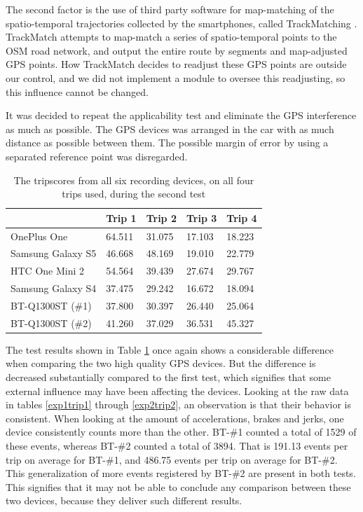 The second factor is the use of third party software for map-matching of the spatio-temporal trajectories collected by the smartphones, called TrackMatching \citep{trackmatch}. TrackMatch attempts to map-match a series of spatio-temporal points to the OSM road network, and output the entire route by segments and map-adjusted GPS points. How TrackMatch decides to readjust these GPS points are outside our control, and we did not implement a module to oversee this readjusting, so this influence cannot be changed. 

It was decided to repeat the applicability test and eliminate the GPS interference as much as possible. The GPS devices was arranged in the car with as much distance as possible between them. The possible margin of error by using a separated reference point was disregarded. 

\begin{table}[tb]
\centering
\caption{The tripscores from all six recording devices, on all four trips used, during the second test}
\label{tab:smartphone_test_two}
\begin{tabular}{|l|llll|}
\hline
\rowcolor{tablegreen}

                   & \textbf{Trip 1}    & \textbf{Trip 2}    & \textbf{Trip 3}    & \textbf{Trip 4}  \\\hline
OnePlus One        & 64.511  & 31.075  & 17.103  & 18.223 \\
Samsung Galaxy S5  & 46.668  & 48.169  & 19.010  & 22.779 \\
HTC One Mini 2     & 54.564  & 39.439  & 27.674  & 29.767 \\
Samsung Galaxy S4  & 37.475  & 29.242  & 16.672  & 18.094 \\
BT-Q1300ST (\#1)   & 37.800  & 30.397  & 26.440  & 25.064 \\
BT-Q1300ST (\#2)   & 41.260  & 37.029  & 36.531  & 45.327 \\\hline

\end{tabular}
\end{table}

The test results shown in Table \ref{tab:smartphone_test_two} once again shows a considerable difference when comparing the two high quality GPS devices. But the difference is decreased substantially compared to the first test, which signifies that some external influence may have been affecting the devices. Looking at the raw data in tables \ref{exp1trip1} through \ref{exp2trip2}, an observation is that their behavior is consistent. When looking at the amount of accelerations, brakes and jerks, one device consistently counts more than the other. BT-\#1 counted a total of 1529 of these events, whereas BT-\#2 counted a total of 3894. That is 191.13 events per trip on average for BT-\#1, and 486.75 events per trip on average for BT-\#2. This generalization of more events registered by BT-\#2 are present in both tests. This signifies that it may not be able to conclude any comparison between these two devices, because they deliver such different results.

